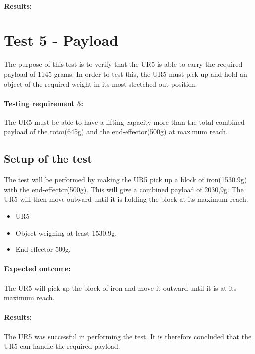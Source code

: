  
\paragraph{Results: }




\section{Test 5 - Payload}
The purpose of this test is to verify that the UR5 is able to carry the required payload of 1145 grams. In order to test this, the UR5 must pick up and hold an object of the required weight in its most stretched out position.

\paragraph{Testing requirement 5:} The UR5 must be able to have a lifting capacity more than the total combined payload of the rotor(645g) and the end-effector(500g) at maximum reach.\\

\subsection{Setup of the test}
The test will be performed by making the UR5 pick up a block of iron(1530.9g) with the end-effector(500g). This will give a combined payload of 2030,9g. The UR5 will then move outward until it is holding the block at its maximum reach. 

 \begin{itemize}
     \item UR5
     \item Object weighing at least 1530.9g.
     \item End-effector 500g.
 \end{itemize}
 
 \paragraph{Expected outcome:}
The UR5 will pick up the block of iron and move it outward until it is at its maximum reach. 

 
\paragraph{Results: }
The UR5 was successful in performing the test. It is therefore concluded that the UR5 can handle the required payload.\\ 


